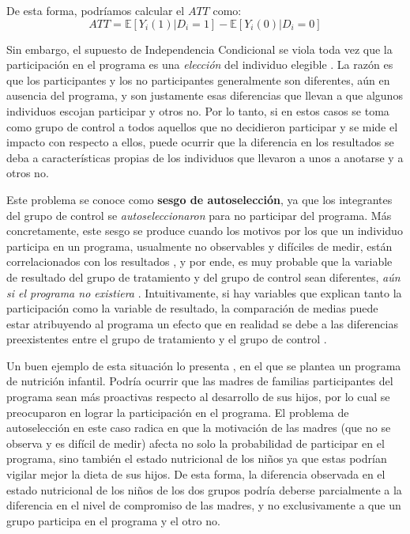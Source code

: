 \documentclass[../../main.tex]{subfiles}
\begin{document}
De esta forma, podríamos calcular el \(ATT\) como:
\begin{equation}
    ATT = \mathbb{E} \left[Y_i(1)|D_i=1\right] - \mathbb{E} \left[Y_i(0)|D_i=0\right]
    \label{eq:ATT-con-supuesto-IC}
\end{equation}

Sin embargo, el supuesto de Independencia Condicional se viola toda vez que la participación en el programa es una \textit{elección} del individuo elegible \cite{bernal}. La razón es que los participantes y los no participantes generalmente son diferentes, aún en ausencia del programa, y son justamente esas diferencias que llevan a que algunos individuos escojan participar y otros no. Por lo tanto, si en estos casos se toma como grupo de control a todos aquellos que no decidieron participar y se mide el impacto con respecto a ellos, puede ocurrir que la diferencia en los resultados se deba a características propias de los individuos que llevaron a unos a anotarse y a otros no.

Este problema se conoce como \textbf{sesgo de autoselección}, ya que los integrantes del grupo de control se \textit{autoseleccionaron} para no participar del programa. Más concretamente, este sesgo se produce cuando los motivos por los que un individuo participa en un programa, usualmente no observables y difíciles de medir, están correlacionados con los resultados \cite{gertler-2016}, y por ende, es muy probable que la variable de resultado del grupo de tratamiento y del grupo de control sean diferentes, \textit{aún si el programa no existiera} \cite{bernal}. Intuitivamente, si hay variables que explican tanto la participación como la variable de resultado, la comparación de medias puede estar atribuyendo al programa un efecto que en realidad se debe a las diferencias preexistentes entre el grupo de tratamiento y el grupo de control \cite{bernal}.

Un buen ejemplo de esta situación lo presenta \cite{bernal}, en el que se plantea un programa de nutrición infantil. Podría ocurrir que las madres de familias participantes del programa sean más proactivas respecto al desarrollo de sus hijos, por lo cual se preocuparon en lograr la participación en el programa. El problema de autoselección en este caso radica en que la motivación de las madres (que no se observa y es difícil de medir) afecta no solo la probabilidad de participar en el programa, sino también el estado nutricional de los niños ya que estas podrían vigilar mejor la dieta de sus hijos. De esta forma, la diferencia observada en el estado nutricional de los niños de los dos grupos podría deberse parcialmente a la diferencia en el nivel de compromiso de las madres, y no exclusivamente a que un grupo participa en el programa y el otro no.
\end{document}
